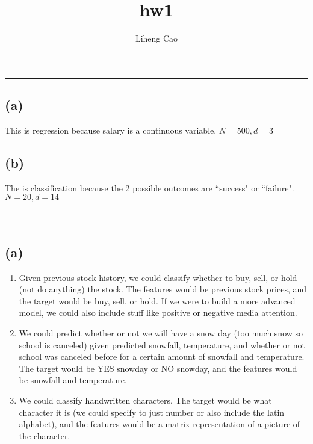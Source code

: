 \documentclass[11pt]{article}
\title{hw1}
\author{Liheng Cao}
\begin{document}
\maketitle

\section{}\hrule
\subsection*{(a)}
This is regression because salary is a continuous variable. $N = 500, d = 3$

\subsection*{(b)}
The is classification because the 2 possible outcomes are ``success" or ``failure". $N = 20, d = 14$
\newpage

\section{}\hrule
\subsection*{(a)}
\begin{enumerate}
	\item Given previous stock history, we could classify whether to buy, sell, or hold (not do anything) the stock. The features would be previous stock prices, and the target would be buy, sell, or hold. If we were to build a more advanced model, we could also include stuff like positive or negative media attention. 
	
	\item We could predict whether or not we will have a snow day (too much snow so school is canceled) given predicted snowfall, temperature, and whether or not school was canceled before for a certain amount of snowfall and temperature. The target would be YES snowday or NO snowday, and the features would be snowfall and temperature.
	
	\item We could classify handwritten characters. The target would be what character it is (we could specify to just number or also include the latin alphabet), and the features would be a matrix representation of a picture of the character.
\end{enumerate}
\end{document}
